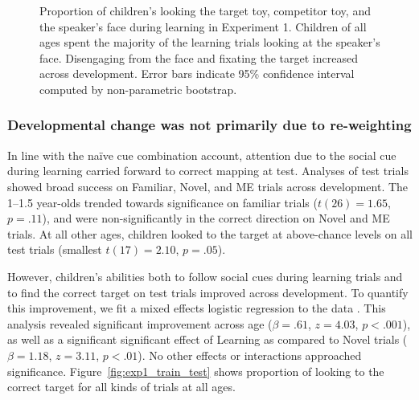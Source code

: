 \documentclass[man,floatsintext]{apa6}
\begin{document}
 \begin{figure}[tb]
	\caption{\label{fig:exp1_train} Proportion of children's looking the target toy, competitor toy, and the speaker's face during learning in Experiment 1. Children of all ages spent the majority of the learning trials looking at the speaker's face. Disengaging from the face and fixating the target increased across development. Error bars indicate 95\% confidence interval computed by non-parametric bootstrap.}
\end{figure}

\vspace{9 pt}

\subsubsection{Developmental change was not primarily due to re-weighting} 

In line with the na\"i{v}e cue combination account, attention due to the social cue during learning carried forward to correct mapping at test. Analyses of test trials showed broad success on Familiar, Novel, and ME trials across development. The 1--1.5 year-olds trended towards significance on familiar trials ($t(26)  = 1.65$, $p = .11$), and were non-significantly in the correct direction on Novel and ME trials. At all other ages, children looked to the target at above-chance levels on all test trials (smallest $t(17)  = 2.10$, $p = .05$). 

However, children's abilities both to follow social cues during learning trials and to find the correct target on test trials improved across development. To quantify this improvement, we fit a mixed effects logistic regression to the data \cite{Jaeger2008}. This analysis revealed significant improvement across age ($\beta = .61$, $z = 4.03$, $p <.001$), as well as a significant significant effect of Learning as compared to Novel trials ($\beta = 1.18$, $z = 3.11$, $p <.01$). No other effects or interactions approached significance. Figure~\ref{fig:exp1_train_test} shows proportion of looking to the correct target for all kinds of trials at all ages. 
\end{document}

